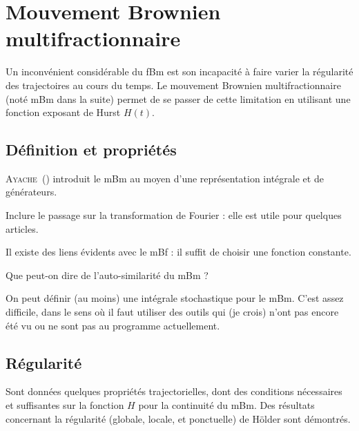 \section{Mouvement Brownien multifractionnaire}
Un inconvénient considérable du fBm est son incapacité à faire varier
la régularité des trajectoires au cours du temps. Le mouvement
Brownien multifractionnaire (noté mBm dans la suite) permet de se
passer de cette limitation en utilisant une fonction exposant de Hurst
$H(t)$.

\subsection{Définition et propriétés}
\textsc{Ayache}~(\cite{ayache2018}) introduit le mBm au moyen d'une
représentation intégrale et de générateurs.

\begin{prerequis}
  Inclure le passage sur la transformation de Fourier : elle est utile
  pour quelques articles.
\end{prerequis}

Il existe des liens évidents avec le mBf : il suffit de choisir une
fonction constante.

\begin{question}
  Que peut-on dire de l'auto-similarité du mBm ?
\end{question}

\begin{prerequis}
  On peut définir (au moins) une intégrale stochastique pour le
  mBm. C'est assez difficile, dans le sens où il faut utiliser des
  outils qui (je crois) n'ont pas encore été vu ou ne sont pas au
  programme actuellement.
\end{prerequis}

\subsection{Régularité}
Sont données quelques propriétés trajectorielles, dont des conditions
nécessaires et suffisantes sur la fonction $H$ pour la continuité du
mBm. Des résultats concernant la régularité (globale, locale, et
ponctuelle) de Hölder sont démontrés.
